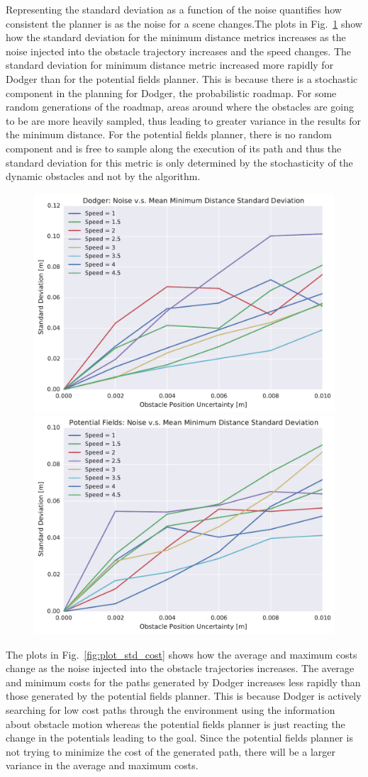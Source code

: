 Representing the standard deviation as a function of the noise quantifies how
consistent the planner is as the noise for a scene changes.The plots in
Fig.~\ref{fig:plot_std_min_distance} show how the standard deviation for the
minimum distance metrics increases as the noise injected into the obstacle
trajectory increases and the speed changes. The standard deviation for minimum
distance metric increased more rapidly for Dodger than for the potential fields
planner.  This is because there is a stochastic component in the planning for
Dodger, the probabilistic roadmap. For some random generations of the roadmap,
areas around where the obstacles are going to be are more heavily sampled, thus
leading to greater variance in the results for the minimum distance. For the
potential fields planner, there is no random component and is free to sample
along the execution of its path and thus the standard deviation for this metric
is only determined by the stochasticity of the dynamic obstacles and not by the
algorithm.

\begin{figure}[h!]
    \centering
    \includegraphics[width=0.48\linewidth]{figs/planner_std_min_distance_0}
    \includegraphics[width=0.48\linewidth]{figs/pf_std_min_distance_0}
    \caption{}
    \label{fig:plot_std_min_distance}
\end{figure}

The plots in Fig.~\ref{fig:plot_std_cost} shows how the average and maximum
costs change as the noise injected into the obstacle trajectories increases.
The average and minimum costs for the paths generated by Dodger increases less
rapidly than those generated by the potential fields planner. This is because
Dodger is actively searching for low cost paths through the environment using
the information about obstacle motion whereas the potential fields planner is
just reacting the change in the potentials leading to the goal. Since the
potential fields planner is not trying to minimize the cost of the generated
path, there will be a larger variance in the average and maximum costs.

